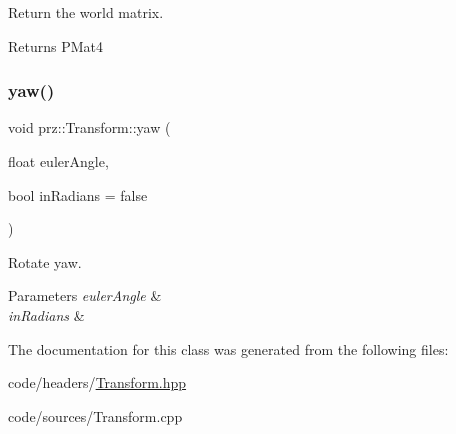 Return the world matrix. 

\begin{DoxyReturn}{Returns}
P\+Mat4 
\end{DoxyReturn}
\mbox{\label{classprz_1_1_transform_a801b4c4effff845ec88805af04eaec0b}} 
\subsubsection{\texorpdfstring{yaw()}{yaw()}}
{\footnotesize\ttfamily void prz\+::\+Transform\+::yaw (\begin{DoxyParamCaption}\item[{float}]{euler\+Angle,  }\item[{bool}]{in\+Radians = {\ttfamily false} }\end{DoxyParamCaption})}



Rotate yaw. 


\begin{DoxyParams}{Parameters}
{\em euler\+Angle} & \\
\hline
{\em in\+Radians} & \\
\hline
\end{DoxyParams}


The documentation for this class was generated from the following files\+:\begin{DoxyCompactItemize}
\item 
code/headers/\mbox{\hyperlink{_transform_8hpp}{Transform.\+hpp}}\item 
code/sources/Transform.\+cpp\end{DoxyCompactItemize}
